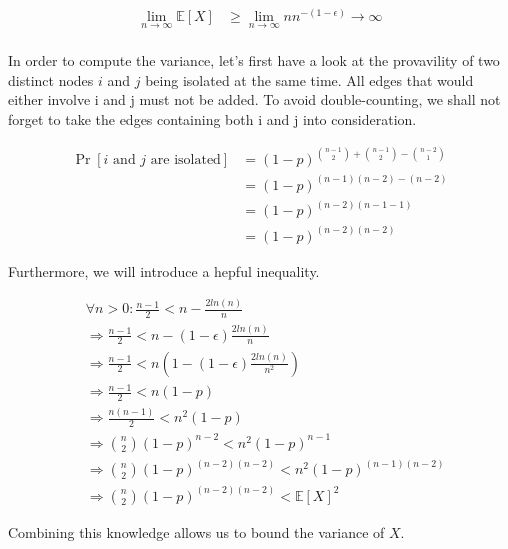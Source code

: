 \documentclass[a4paper,german]{article}
\begin{document}
\begin{enumerate}
\begin{align*}
\lim_{n \to \infty} \mathbb{E}[X] &\geq \lim_{n \to \infty} n n^{-(1 - \epsilon)} \to \infty\\
\end{align*}

In order to compute the variance, let's first have a look at the provavility of two distinct nodes \(i\) and \(j\) being isolated at the same time. All edges that would either involve i and j must not be added. To avoid double-counting, we shall not forget to take the edges containing both i and j into consideration.

\begin{align}
\Pr[i \text{ and } j \text{ are isolated}] &= (1-p)^{ {{n-1} \choose {2}} + {{n-1} \choose {2}} - {{n-2} \choose {1}} } \nonumber\\ 
&=  (1-p)^{(n-1)(n-2) - (n-2) } \nonumber \\
&=  (1-p)^{(n-2)(n-1 -1 ) } \nonumber \\
&=  (1-p)^{(n-2)(n-2) }  \label{eq1} 
\end{align}

Furthermore, we will introduce a hepful inequality.

\begin{align}
& \forall n > 0: \frac{n-1}{2} < n - \frac{2ln(n)}{n} \nonumber \\
& \Rightarrow \frac{n-1}{2} < n - (1-\epsilon) \frac{2ln(n)}{n} \nonumber \\
& \Rightarrow \frac{n-1}{2} < n(1 - (1-\epsilon) \frac{2ln(n)}{n^2}) \nonumber \\
& \Rightarrow \frac{n-1}{2}  < n(1-p) \nonumber \\
& \Rightarrow \frac{n(n-1)}{2}  < n^2(1-p) \nonumber \\
& \Rightarrow {{n} \choose {2}} (1-p)^{n-2} < n^2(1-p)^{n-1} \nonumber \\
& \Rightarrow {{n} \choose {2}} (1-p)^{(n-2)(n-2)} < n^2(1-p)^{(n-1)(n-2)} \nonumber \\
& \Rightarrow {{n} \choose {2}} (1-p)^{(n-2)(n-2)} < \mathbb{E}[X]^2 \label{eq2}
\end{align}

Combining this knowledge allows us to bound the variance of \(X\).


\end{enumerate}
\end{document}
